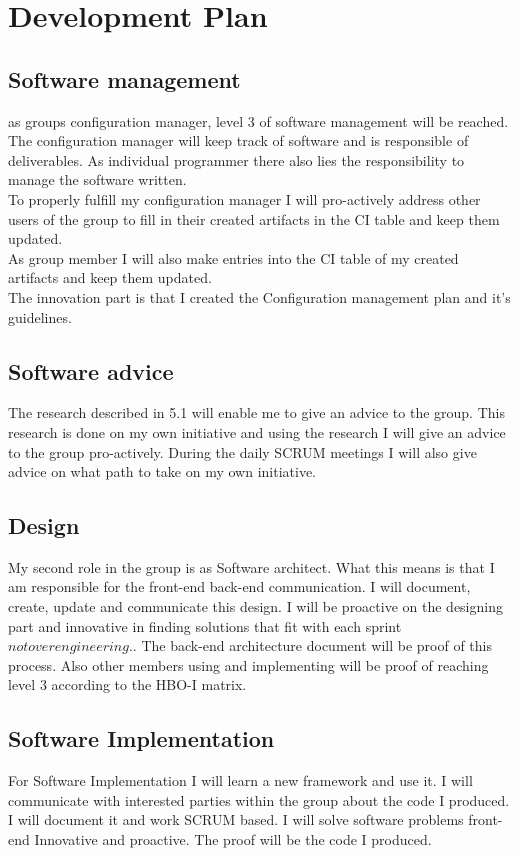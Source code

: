 \newpage
\section{Development Plan}
\label{sec:development}

\subsection{Software management}
as groups configuration manager, level 3 of software management will be reached. The configuration manager will keep track of software and is responsible of deliverables. As individual programmer there also lies the responsibility to manage the software written.\\  
To properly fulfill my configuration manager I will pro-actively address other users of the group to fill in their created artifacts in the CI table and keep them updated.  \\
As group member I will also make entries into the CI table of my created artifacts and keep them updated. \\
The innovation part is that I created the Configuration management plan and it's guidelines.


\subsection{Software advice}
The research described in 5.1 will enable me to give an advice to the group. This research is done on my own initiative and using the research I will give an advice to the group pro-actively. During the daily SCRUM meetings I will also give advice on what path to take on my own initiative.

\subsection{Design}
My second role in the group is as Software architect. What this means is that I am responsible for the front-end back-end communication. I will document, create, update and communicate this design.
I will be proactive on the designing part and innovative in finding solutions that fit with each sprint \(not overengineering.\). The back-end architecture document will be proof of this process. Also other members using and implementing will be proof of reaching level 3 according to the HBO-I matrix.

\subsection{Software Implementation}
For Software Implementation I will learn a new framework and use it. I will communicate with interested parties within the group about the code I produced. I will document it and work SCRUM based. I will solve software problems front-end Innovative and proactive. The proof will be the code I produced.


